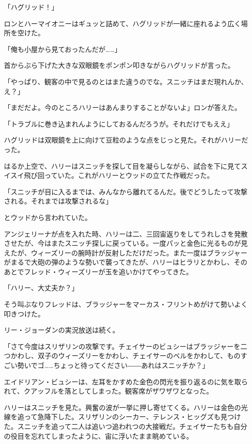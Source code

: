 \documentclass[10pt,a4paper]{article}
\begin{document}
\begin{CJK}{UTF8}{min}
「ハグリッド！」

ロンとハーマイオニーはギュッと詰めて、ハグリッドが一緒に座れるよう広く場所を空けた。

「俺も小屋から見ておったんだが……」

首からぶら下げた大きな双眼鏡をポンポン叩きながらハグリッドが言った。

「やっぱり、観客の中で見るのとはまた違うのでな。スニッチはまだ現れんか、え？」

「まだだよ。今のところハリーはあんまりすることがないよ」ロンが答えた。

「トラブルに巻き込まれんようにしておるんだろうが。それだけでもええ」

ハグリッドは双眼鏡を上に向けて豆粒のような点をじっと見た。それがハリーだった。

はるか上空で、ハリーはスニッチを探して目を凝らしながら、試合を下に見てスイスイ飛び回っていた。これがハリーとウッドの立てた作戦だった。

「スニッチが目に入るまでは、みんなから離れてるんだ。後でどうしたって攻撃される。それまでは攻撃されるな」

とウッドから言われていた。

アンジェリーナが点を入れた時、ハリーは二、三回宙返りをしてうれしさを発散させたが、今はまたスニッチ探しに戻っている。一度パッと金色に光るものが見えたが、ウィーズリーの腕時計が反射しただけだった。また一度はブラッジャーがまるで大砲の弾のような勢いで襲ってきたが、ハリーはヒラリとかわし、そのあとでフレッド・ウィーズリーが玉を追いかけてやってきた。

「ハリー、大丈夫か？」

そう叫ぶなりフレッドは、ブラッジャーをマーカス・フリントめがけて勢いよく叩きつけた。

リー・ジョーダンの実況放送は続く。

「さて今度はスリザリンの攻撃です。チェイサーのビュシーはブラッジャーを二つかわし、双子のウィーズリーをかわし、チェイサーのベルをかわして、ものすごい勢いでゴ……ちょっと待ってください――あれはスニッチか？」

エイドリアン・ビュシーは、左耳をかすめた金色の閃光を振り返るのに気を取られて、クアッフルを落としてしまった。観客席がザワザワとなった。

ハリーはスニッチを見た。興奮の波が一挙に押し寄せてくる。ハリーは金色の光線を追って急降下した。スリザリンのシーカー、テレンス・ヒッグズも見つけた。スニッチを追って二人は追いつ追われつの大接戦だ。チェイサーたちも自分の役目を忘れてしまったように、宙に浮いたまま眺めている。


\end{CJK}
\end{document}
